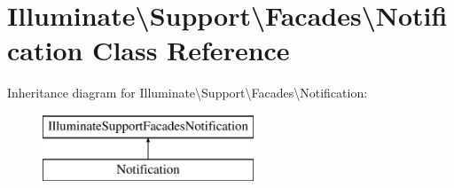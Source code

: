 \hypertarget{class_illuminate_1_1_support_1_1_facades_1_1_notification}{}\section{Illuminate\textbackslash{}Support\textbackslash{}Facades\textbackslash{}Notification Class Reference}
\label{class_illuminate_1_1_support_1_1_facades_1_1_notification}
Inheritance diagram for Illuminate\textbackslash{}Support\textbackslash{}Facades\textbackslash{}Notification\+:\begin{figure}[H]
\begin{center}
\leavevmode
\includegraphics[height=2.000000cm]{class_illuminate_1_1_support_1_1_facades_1_1_notification}
\end{center}
\end{figure}
